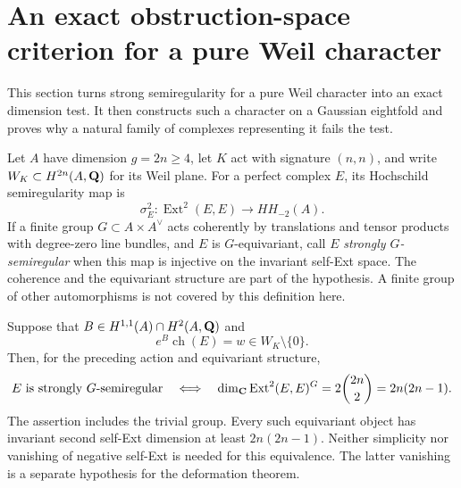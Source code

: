 \section{An exact obstruction-space criterion for a pure Weil character}
\label{sec:pure-weil-complexes}
This section turns strong semiregularity for a pure Weil character into an exact dimension test. It then constructs such a character on a Gaussian eightfold and proves why a natural family of complexes representing it fails the test.

Let $A$ have dimension $g=2n\ge4$, let $K$ act with signature $(n,n)$, and write $W_K\subset H^{2n}(A,\mathbf Q)$ for its Weil plane. For a perfect complex $E$, its Hochschild semiregularity map is
\[
 \sigma_E^2:\operatorname{Ext}^2(E,E)\longrightarrow HH_{-2}(A).
\]
If a finite group $G\subset A\times A^\vee$ acts coherently by translations and tensor products with degree-zero line bundles, and $E$ is $G$-equivariant, call $E$ \emph{strongly $G$-semiregular} when this map is injective on the invariant self-Ext space. The coherence and the equivariant structure are part of the hypothesis. A finite group of other automorphisms is not covered by this definition here.

\begin{theorem}\label{thm:pure-weil-ext}
Suppose that $B\in H^{1,1}(A)\cap H^2(A,\mathbf Q)$ and
\[
 e^B\operatorname{ch}(E)=w\in W_K\setminus\{0\}.
\]
Then, for the preceding action and equivariant structure,
\[
 E\text{ is strongly }G\text{-semiregular}
 \quad\Longleftrightarrow\quad
 \dim_{\mathbf C}\operatorname{Ext}^2(E,E)^G
     =2\binom{2n}{2}=2n(2n-1).
\]
The assertion includes the trivial group. Every such equivariant object has invariant second self-Ext dimension at least $2n(2n-1)$. Neither simplicity nor vanishing of negative self-Ext is needed for this equivalence. The latter vanishing is a separate hypothesis for the deformation theorem.
\end{theorem}

